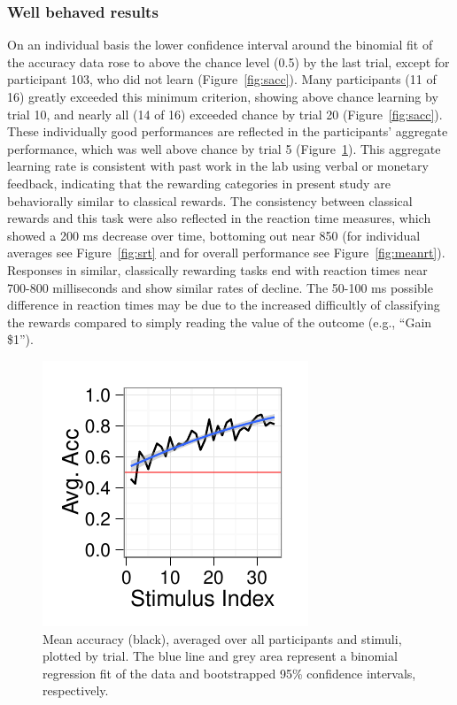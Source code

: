 \subsubsection{Well behaved results}
\label{subsub:wellbehaved}
On an individual basis the lower confidence interval around the binomial fit of the accuracy data rose to above the chance level (0.5) by the last trial, except for participant 103, who did not learn (Figure~\ref{fig:sacc}).  Many participants (11 of 16) greatly exceeded this minimum criterion, showing above chance learning by trial 10, and nearly all (14 of 16) exceeded chance by trial 20  (Figure~\ref{fig:sacc}).  These individually good performances are reflected in the participants' aggregate performance, which was well above chance by trial 5 (Figure~\ref{fig:meanacc}).  This aggregate learning rate is consistent with past work in the lab using verbal or monetary feedback, indicating that the rewarding categories in present study are behaviorally similar to classical rewards.  The consistency between classical rewards and this task were also reflected in the reaction time measures, which showed a 200 ms decrease over time, bottoming out near 850 (for individual averages see Figure~\ref{fig:srt} and for overall performance see Figure~\ref{fig:meanrt}).  Responses in similar, classically rewarding tasks end with reaction times near 700-800 milliseconds and show similar rates of decline.  The 50-100 ms possible difference in reaction times may be due to the increased difficultly of classifying the rewards compared to simply reading the value of the outcome (e.g., ``Gain \$1'').

\begin{figure}[tp]
    \includegraphics{f_all_mean_acc}
    \centering
    \caption{Mean accuracy (black), averaged over all participants and stimuli, plotted by trial.  The blue line and grey area represent a binomial regression fit of the data and bootstrapped 95\% confidence intervals, respectively.}
    \label{fig:meanacc}
\end{figure}

